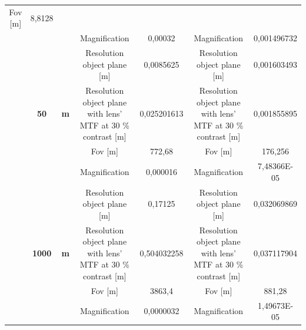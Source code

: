 \begin{table}[H]
{\begin{tabular}{ccc|cc|cc|}
  \cellcolor[HTML]{EFEFEF}Fov {[}m{]} &
  \cellcolor[HTML]{EFEFEF}8,8128 \\
\multicolumn{1}{|c|}{} &
  \cellcolor[HTML]{EFEFEF} &
  \cellcolor[HTML]{EFEFEF} &
  Magnification &
  0,00032 &
  Magnification &
  0,001496732 \\
\multicolumn{1}{|c|}{} &
  \cellcolor[HTML]{EFEFEF} &
  \cellcolor[HTML]{EFEFEF} &
  \cellcolor[HTML]{EFEFEF}Resolution object plane {[}m{]} &
  \cellcolor[HTML]{EFEFEF}0,0085625 &
  \cellcolor[HTML]{EFEFEF}Resolution object plane {[}m{]} &
  \cellcolor[HTML]{EFEFEF}0,001603493 \\
\multicolumn{1}{|c|}{} &
  \multirow{-4}{*}{\cellcolor[HTML]{EFEFEF}\textbf{50}} &
  \multirow{-4}{*}{\cellcolor[HTML]{EFEFEF}\textbf{m}} &
  Resolution object plane with lens' MTF at 30 \% contrast {[}m{]} &
  0,025201613 &
  Resolution object plane with lens' MTF at 30 \% contrast {[}m{]} &
  0,001855895 \\ \cline{2-7} 
\multicolumn{1}{|c|}{} &
  \cellcolor[HTML]{EFEFEF} &
  \cellcolor[HTML]{EFEFEF} &
  \cellcolor[HTML]{EFEFEF}Fov {[}m{]} &
  \cellcolor[HTML]{EFEFEF}772,68 &
  \cellcolor[HTML]{EFEFEF}Fov {[}m{]} &
  \cellcolor[HTML]{EFEFEF}176,256 \\
\multicolumn{1}{|c|}{} &
  \cellcolor[HTML]{EFEFEF} &
  \cellcolor[HTML]{EFEFEF} &
  Magnification &
  0,000016 &
  Magnification &
  7,48366E-05 \\
\multicolumn{1}{|c|}{} &
  \cellcolor[HTML]{EFEFEF} &
  \cellcolor[HTML]{EFEFEF} &
  \cellcolor[HTML]{EFEFEF}Resolution object plane {[}m{]} &
  \cellcolor[HTML]{EFEFEF}0,17125 &
  \cellcolor[HTML]{EFEFEF}Resolution object plane {[}m{]} &
  \cellcolor[HTML]{EFEFEF}0,032069869 \\
\multicolumn{1}{|c|}{} &
  \multirow{-4}{*}{\cellcolor[HTML]{EFEFEF}\textbf{1000}} &
  \multirow{-4}{*}{\cellcolor[HTML]{EFEFEF}\textbf{m}} &
  Resolution object plane with lens' MTF at 30 \% contrast {[}m{]} &
  0,504032258 &
  Resolution object plane with lens' MTF at 30 \% contrast {[}m{]} &
  0,037117904 \\ \cline{2-7} 
\multicolumn{1}{|c|}{} &
  \cellcolor[HTML]{EFEFEF} &
  \cellcolor[HTML]{EFEFEF} &
  \cellcolor[HTML]{EFEFEF}Fov {[}m{]} &
  \cellcolor[HTML]{EFEFEF}3863,4 &
  \cellcolor[HTML]{EFEFEF}Fov {[}m{]} &
  \cellcolor[HTML]{EFEFEF}881,28 \\
\multicolumn{1}{|c|}{} &
  \cellcolor[HTML]{EFEFEF} &
  \cellcolor[HTML]{EFEFEF} &
  Magnification &
  0,0000032 &
  Magnification &
  1,49673E-05 \\

\end{tabular}}
\end{table}
